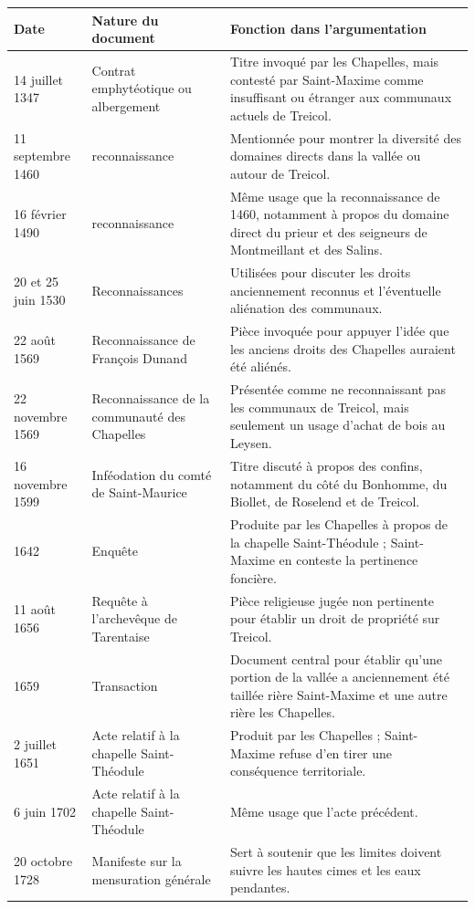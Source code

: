 \documentclass[a4paper,twoside,openany]{article}
\begin{document}
\begin{longtable}{p{3cm}p{5.2cm}p{7cm}}
\toprule
Date & Nature du document & Fonction dans l'argumentation \\
\midrule
14 juillet 1347 & Contrat emphytéotique ou \gls{albergement} & Titre invoqué par les Chapelles, mais contesté par Saint-Maxime comme insuffisant ou étranger aux communaux actuels de Treicol. \\
11 septembre 1460 & \gls{reconnaissance} & Mentionnée pour montrer la diversité des domaines directs dans la vallée ou autour de Treicol. \\
16 février 1490 & \gls{reconnaissance} & Même usage que la reconnaissance de 1460, notamment à propos du domaine direct du prieur et des seigneurs de Montmeillant et des Salins. \\
20 et 25 juin 1530 & Reconnaissances & Utilisées pour discuter les droits anciennement reconnus et l'éventuelle aliénation des communaux. \\
22 août 1569 & Reconnaissance de François Dunand & Pièce invoquée pour appuyer l'idée que les anciens droits des Chapelles auraient été aliénés. \\
22 novembre 1569 & Reconnaissance de la communauté des Chapelles & Présentée comme ne reconnaissant pas les communaux de Treicol, mais seulement un usage d'achat de bois au Leysen. \\
16 novembre 1599 & Inféodation du comté de Saint-Maurice & Titre discuté à propos des confins, notamment du côté du Bonhomme, du Biollet, de Roselend et de Treicol. \\
1642 & Enquête & Produite par les Chapelles à propos de la chapelle Saint-Théodule ; Saint-Maxime en conteste la pertinence foncière. \\
11 août 1656 & Requête à l'archevêque de Tarentaise & Pièce religieuse jugée non pertinente pour établir un droit de propriété sur Treicol. \\
1659 & Transaction & Document central pour établir qu'une portion de la vallée a anciennement été taillée rière Saint-Maxime et une autre rière les Chapelles. \\
2 juillet 1651 & Acte relatif à la chapelle Saint-Théodule & Produit par les Chapelles ; Saint-Maxime refuse d'en tirer une conséquence territoriale. \\
6 juin 1702 & Acte relatif à la chapelle Saint-Théodule & Même usage que l'acte précédent. \\
20 octobre 1728 & Manifeste sur la mensuration générale & Sert à soutenir que les limites doivent suivre les hautes cimes et les eaux pendantes. \\

\end{longtable}
\end{document}
